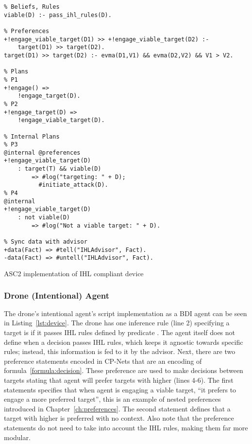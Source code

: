 

\begin{listing}
\centering
\begin{verbatim}
% Beliefs, Rules
viable(D) :- pass_ihl_rules(D).

% Preferences
+!engage_viable_target(D1) >> +!engage_viable_target(D2) :-
    target(D1) >> target(D2).
target(D1) >> target(D2) :- evma(D1,V1) && evma(D2,V2) && V1 > V2.

% Plans
% P1
+!engage() =>
    !engage_target(D).
% P2
+!engage_target(D) =>
    !engage_viable_target(D).

% Internal Plans
% P3
@internal @preferences
+!engage_viable_target(D)
    : target(T) && viable(D)
        => #log("targeting: " + D);
          #initiate_attack(D).
% P4
@internal
+!engage_viable_target(D)
    : not viable(D)
        => #log("Not a viable target: " + D).

% Sync data with advisor
+data(Fact) => #tell("IHLAdvisor", Fact).
-data(Fact) => #untell("IHLAdvisor", Fact).
\end{verbatim}
\caption{ASC2 implementation of IHL compliant device}
\label{lst:device}
\end{listing}


\subsubsection{Drone (Intentional) Agent}
The drone's intentional agent's script implementation as a BDI agent can be seen in Listing~\ref{lst:device}. The drone has one inference rule (line 2) specifying a target is  if it passes IHL rules defined by predicate . The agent itself does not define when a decision passes IHL rules, which keeps it agnostic towards specific rules; instead, this information is fed to it by the advisor. Next, there are two preference statements encoded in CP-Nets that are an encoding of formula~\ref{formula:decision}. These preference are used to make decisions between targets stating that agent will prefer targets with higher  (lines 4-6). The first statements specifies that when agent is engaging a viable target, ``it prefers to engage a more preferred target'', this is an example of nested preferences introduced in Chapter~\ref{ch:preferences}. The second statement defines that a target with higher  is preferred with no context. Also note that the preference statements do not need to take into account the IHL rules, making them far more modular. 

